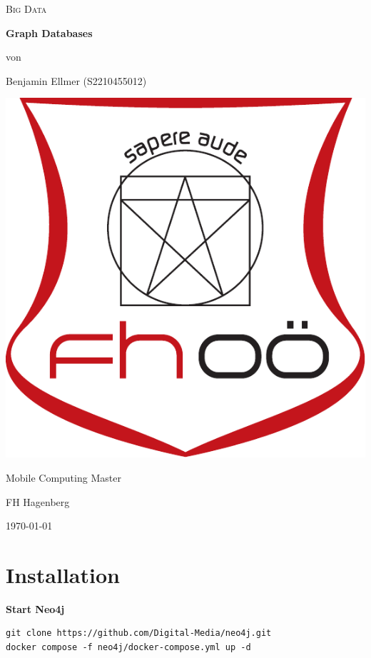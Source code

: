 \documentclass[14pt,a4paper]{extarticle}
\begin{document}
	\begin{titlepage}
		\centering
		{\scshape\LARGE Big Data \par}
		\vspace{2.5cm}
		{\huge\bfseries Graph Databases}
		\vfill
		{\normalsize von\par}
		{\normalsize Benjamin Ellmer (\textsc{S2210455012}) \par}
		\vspace{1cm}
		\includegraphics[width=0.3\textheight]{images/logo.pdf} \par
		\vspace{1cm}
		{\large Mobile Computing Master \par}
		{\large FH Hagenberg \par}
		\vfill
		{\large \today\par}
	\end{titlepage}

	\section*{Installation}
	\noindent \textbf{Start Neo4j}
	\begin{lstlisting}[style=fish]
git clone https://github.com/Digital-Media/neo4j.git
docker compose -f neo4j/docker-compose.yml up -d
	\end{lstlisting}
\end{document}
